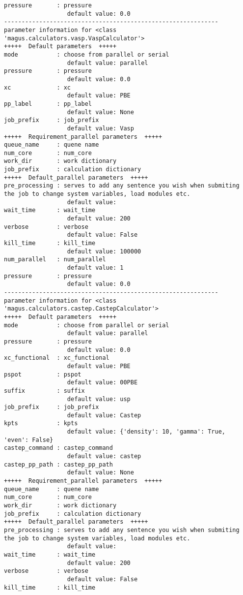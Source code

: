 \documentclass[12pt,oneside]{book}
\begin{document}
\begin{tcolorbox}
\begin{verbatim}
pressure       : pressure
                  default value: 0.0
-------------------------------------------------------------
parameter information for <class 'magus.calculators.vasp.VaspCalculator'>
+++++  Default parameters  +++++
mode           : choose from parallel or serial
                  default value: parallel
pressure       : pressure
                  default value: 0.0
xc             : xc
                  default value: PBE
pp_label       : pp_label
                  default value: None
job_prefix     : job_prefix
                  default value: Vasp
+++++  Requirement_parallel parameters  +++++
queue_name     : quene name
num_core       : num_core
work_dir       : work dictionary
job_prefix     : calculation dictionary
+++++  Default_parallel parameters  +++++
pre_processing : serves to add any sentence you wish when submiting the job to change system variables, load modules etc.
                  default value: 
wait_time      : wait_time
                  default value: 200
verbose        : verbose
                  default value: False
kill_time      : kill_time
                  default value: 100000
num_parallel   : num_parallel
                  default value: 1
pressure       : pressure
                  default value: 0.0
-------------------------------------------------------------
parameter information for <class 'magus.calculators.castep.CastepCalculator'>
+++++  Default parameters  +++++
mode           : choose from parallel or serial
                  default value: parallel
pressure       : pressure
                  default value: 0.0
xc_functional  : xc_functional
                  default value: PBE
pspot          : pspot
                  default value: 00PBE
suffix         : suffix
                  default value: usp
job_prefix     : job_prefix
                  default value: Castep
kpts           : kpts
                  default value: {'density': 10, 'gamma': True, 'even': False}
castep_command : castep_command
                  default value: castep
castep_pp_path : castep_pp_path
                  default value: None
+++++  Requirement_parallel parameters  +++++
queue_name     : quene name
num_core       : num_core
work_dir       : work dictionary
job_prefix     : calculation dictionary
+++++  Default_parallel parameters  +++++
pre_processing : serves to add any sentence you wish when submiting the job to change system variables, load modules etc.
                  default value: 
wait_time      : wait_time
                  default value: 200
verbose        : verbose
                  default value: False
kill_time      : kill_time

\end{verbatim}
\end{tcolorbox}
\end{document}

